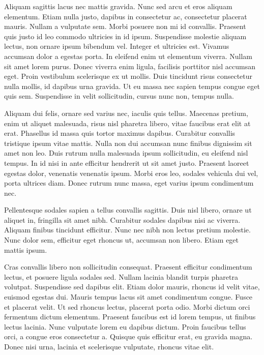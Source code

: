 \documentclass[a4paper,12pt]{report}
\begin{document}
Aliquam sagittis lacus nec mattis gravida. Nunc sed arcu et eros aliquam elementum. Etiam nulla justo, dapibus in consectetur ac, consectetur placerat mauris. Nullam a vulputate sem. Morbi posuere non mi id convallis. Praesent quis justo id leo commodo ultricies in id ipsum. Suspendisse molestie aliquam lectus, non ornare ipsum bibendum vel. Integer et ultricies est. Vivamus accumsan dolor a egestas porta. In eleifend enim ut elementum viverra. Nullam sit amet lorem purus. Donec viverra enim ligula, facilisis porttitor nisl accumsan eget. Proin vestibulum scelerisque ex ut mollis. Duis tincidunt risus consectetur nulla mollis, id dapibus urna gravida. Ut eu massa nec sapien tempus congue eget quis sem. Suspendisse in velit sollicitudin, cursus nunc non, tempus nulla.

Aliquam dui felis, ornare sed varius nec, iaculis quis tellus. Maecenas pretium, enim ut aliquet malesuada, risus nisl pharetra libero, vitae faucibus erat elit at erat. Phasellus id massa quis tortor maximus dapibus. Curabitur convallis tristique ipsum vitae mattis. Nulla non dui accumsan nunc finibus dignissim sit amet non leo. Duis rutrum nulla malesuada ipsum sollicitudin, eu eleifend nisl tempus. In id nisi in ante efficitur hendrerit ut sit amet justo. Praesent laoreet egestas dolor, venenatis venenatis ipsum. Morbi eros leo, sodales vehicula dui vel, porta ultrices diam. Donec rutrum nunc massa, eget varius ipsum condimentum nec.

Pellentesque sodales sapien a tellus convallis sagittis. Duis nisl libero, ornare ut aliquet in, fringilla sit amet nibh. Curabitur sodales dapibus nisi ac viverra. Aliquam finibus tincidunt efficitur. Nunc nec nibh non lectus pretium molestie. Nunc dolor sem, efficitur eget rhoncus ut, accumsan non libero. Etiam eget mattis ipsum.

Cras convallis libero non sollicitudin consequat. Praesent efficitur condimentum lectus, et posuere ligula sodales sed. Nullam lacinia blandit turpis pharetra volutpat. Suspendisse sed dapibus elit. Etiam dolor mauris, rhoncus id velit vitae, euismod egestas dui. Mauris tempus lacus sit amet condimentum congue. Fusce et placerat velit. Ut sed rhoncus lectus, placerat porta odio. Morbi dictum orci fermentum dictum elementum. Praesent faucibus est id lorem tempus, ut finibus lectus lacinia. Nunc vulputate lorem eu dapibus dictum. Proin faucibus tellus orci, a congue eros consectetur a. Quisque quis efficitur erat, eu gravida magna. Donec nisi urna, lacinia et scelerisque vulputate, rhoncus vitae elit.
\end{document}
